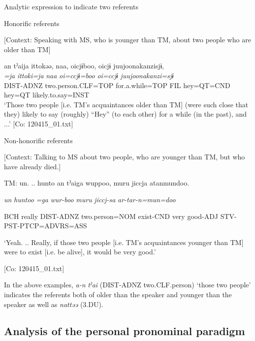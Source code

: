 \ea \label{ex:5:13}   Analytic expression to indicate two referents

  \ea Honorific referents

  [Context: Speaking with MS, who is younger than TM, about two people who are older than TM]

\glll  an  tˀaija  ittokəə,  naa,  {\textbar}oi{\textbar}cjɨboo, {\textbar}oi{\textbar}cjɨ  {\textbar}juujoonakanzi{\textbar}sjɨ,\\
\textit{}  \textit{=ja}  \textit{ittoki=ja}  \textit{naa}  \textit{oi=ccjɨ=boo}  \textit{oi=ccjɨ}  \textit{juujoonakanzi=sjɨ}\\
DIST-ADNZ  two.person.CLF=TOP  for.a.while=TOP  FIL  hey=QT=CND  hey=QT  likely.to.say=INST\\
\glt ‘Those two people [i.e. TM’s acquaintances older than TM] (were such close that they) likely to say (roughly) “Hey” (to each other) for a while (in the past), and ...’ [Co: 120415\_01.txt]

  \ex Non-honorific referents

  [Context: Talking to MS about two people, who are younger than TM, but who have already died.]

  TM:  un.  .. hunto  an  tˀaiga  wuppoo,  muru jiccja  atanmundoo.
                                                                                                  
    \textit{un}  \textit{huntoo}  \textit{}  \textit{=ga}  \textit{wur-boo}  \textit{muru} \textit{jiccj-sa}  \textit{ar-tar-n=mun=doo}
                                                                                                  
    BCH  really  DIST-ADNZ  two.person=NOM  exist-CND  very   good-ADJ  STV-PST-PTCP=ADVRS=ASS

    ‘Yeah. .. Really, if those two people [i.e. TM’s acquaintances younger than TM] were to exist [i.e. be alive], it would be very good.’

    [Co: 120415\_01.txt]
\z
\z

In the above examples, \textit{a-n} \textit{tˀai} (DIST-ADNZ two.CLF.person) ‘those two people’ indicates the referents both of older than the speaker and younger than the speaker as well as \textit{nattəə} (3.DU).

\subsection{Analysis of the personal pronominal paradigm}

